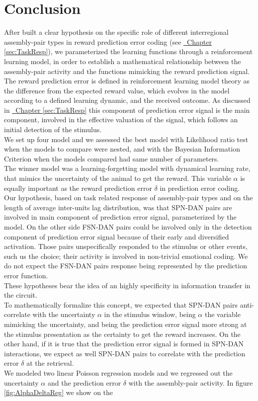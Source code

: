 \section{Conclusion}
\label{sec:concRL}
After built a clear hypothesis on the specific role of different interregional assembly-pair types in reward prediction error coding (see \hyperref[sec:TaskResp]{~Chapter \ref*{sec:TaskResp}}), we parameterized the learning functions through a reinforcement learning model, in order to establish a mathematical relationship between the assembly-pair activity and the functions mimicking the reward prediction signal.\\The reward prediction error is defined in reinforcement learning model theory as the difference from the expected reward value, which evolves in the model according to a defined learning dynamic, and the received outcome. As discussed in \hyperref[sec:TaskResp]{~Chapter \ref*{sec:TaskResp}} this component of prediction error signal is the main component, involved in the effective valuation of the signal, which follows an initial detection of the stimulus.\\We set up four model and we assessed the best model with Likelihood ratio test when the models to compare were nested, and with the Bayesian Information Criterion when the models compared had same number of parameters.\\The winner model was a learning-forgetting model with dynamical learning rate, that mimics the uncertainty of the animal to get the reward. This variable $\alpha$ is equally important as the reward prediction error $\delta$ in prediction error coding.\\Our hypothesis, based on task related response of assembly-pair types and on the length of average inter-units lag distribution, was that SPN-DAN pairs are involved in main component of prediction error signal, parameterized by the model. On the other side FSN-DAN pairs could be involved only in the detection component of prediction error signal because of their early and diversified activation. Those pairs unspecifically responded to the stimulus or other events, such us the choice; their activity is involved in non-trivial emotional coding. We do not expect the FSN-DAN pairs response being represented by the prediction error function.\\These hypotheses bear the idea of an highly specificity in information transfer in the circuit.\\To mathematically formalize this concept, we expected that SPN-DAN pairs anti-correlate with the uncertainty $\alpha$ in the stimulus window, being $\alpha$ the variable mimicking the uncertainty, and being the prediction error signal more strong at the stimulus presentation as the certainty to get the reward increases. On the other hand, if it is true that the prediction error signal is formed in SPN-DAN interactions, we expect as well SPN-DAN pairs to correlate with the prediction error $\delta$ at the retrieval.\\We modeled two linear Poisson regression models and we regressed out the uncertainty $\alpha$ and the prediction error $\delta$ with the assembly-pair activity. In figure \ref{fig:AlphaDeltaReg} we show on the 